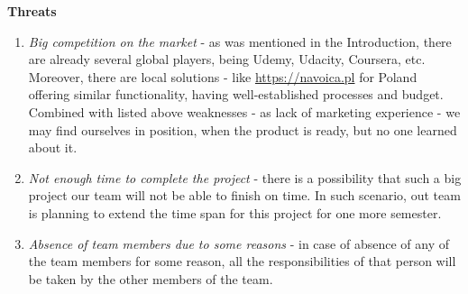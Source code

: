 \documentclass[a4paper,11pt,twoside]{report}
\theoremstyle{definition}
\begin{document}
\textbf{Threats}
\begin{enumerate}
    \item \textit{Big competition on the market} - as was mentioned in the Introduction, there are already several global players, being Udemy, Udacity, Coursera, etc. Moreover, there are local solutions - like \href{https://navoica.pl}{https://navoica.pl} for Poland offering similar functionality, having well-established processes and budget. Combined with listed above weaknesses - as lack of marketing experience - we may find ourselves in position, when the product is ready, but no one learned about it.
     \item \textit{Not enough time to complete the project} - there is a possibility that such a big project our team will not be able to finish on time. In such scenario, out team is planning to extend the time span for this project for one more semester.
      \item \textit{Absence of team members due to some reasons} - in case of absence of any of the team members for some reason, all the responsibilities of that person will be taken by the other members of the team.
\end{enumerate}
\end{document}
